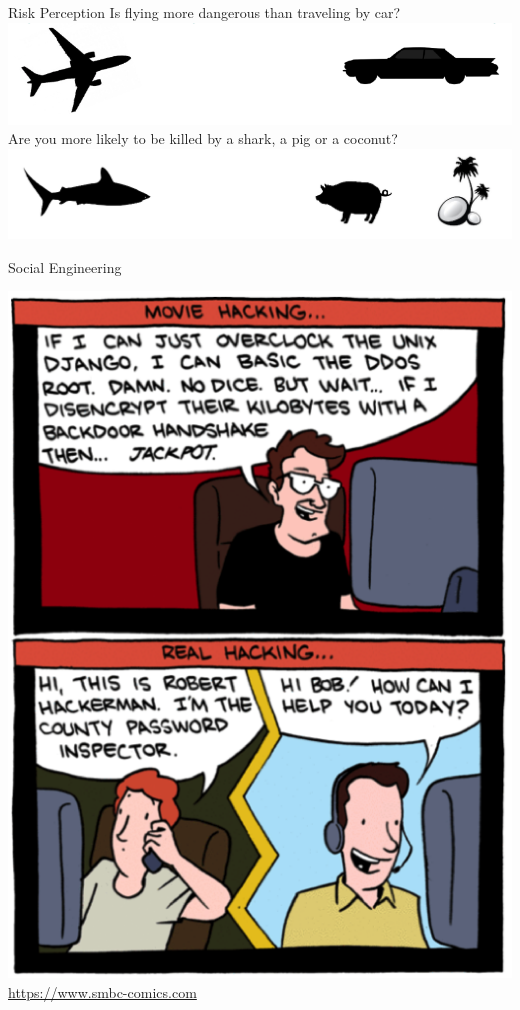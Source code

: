 \documentclass{beamer}
\begin{document}
\begin{frame}{Risk Perception}
Is flying more dangerous than traveling by car?
\newline
\includegraphics[width=0.8\linewidth]{planecar.png}
\newline 
Are you more likely to be killed by a shark, a pig or a coconut?
\newline
\includegraphics[width=0.8\linewidth]{sharkpigcoco.png}
\end{frame}

\begin{frame}{Social Engineering}
\begin{center}
\includegraphics[width=0.4\linewidth]{socialengineering.png}\newline
{\small \url{https://www.smbc-comics.com}}
\end{center}
\end{frame}
\end{document}
